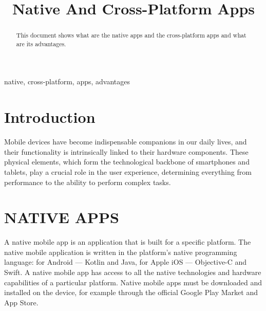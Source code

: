 \documentclass[conference]{IEEEtran}
\begin{document}
\title{Native And Cross-Platform Apps\\
}

\author{
}

\maketitle

\begin{abstract}
This document shows what are the native apps and the cross-platform apps and what are its advantages.
\end{abstract}

\begin{IEEEkeywords}
native, cross-platform, apps, advantages
\end{IEEEkeywords}

\section{Introduction}
Mobile devices have become indispensable companions in our daily lives, and their functionality is intrinsically linked to their hardware components. These physical elements, which form the technological backbone of smartphones and tablets, play a crucial role in the user experience, determining everything from performance to the ability to perform complex tasks.

\section{NATIVE APPS}
A native mobile app is an application that is built for a specific platform. The native mobile application is written in the platform's native programming language: for Android — Kotlin and Java, for Apple iOS — Objective-C and Swift. A native mobile app has access to all the native technologies and hardware capabilities of a particular platform. Native mobile apps must be downloaded and installed on the device, for example through the official Google Play Market and App Store.
\end{document}
